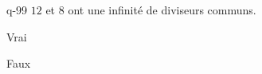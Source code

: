 \begin{truefalse}{q-99}
$12$ et $8$ ont une infinité de diviseurs communs.
\item Vrai
\item* Faux
\end{truefalse}

